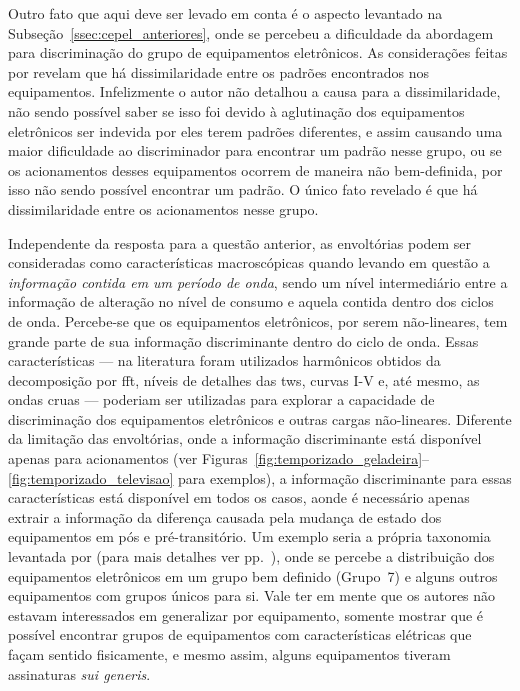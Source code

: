 Outro fato que aqui deve ser levado em conta é o aspecto levantado na
Subseção~\ref{ssec:cepel_anteriores}, onde se percebeu a dificuldade
da abordagem para discriminação do grupo de equipamentos eletrônicos.  As
considerações feitas por \citeauthor*{nilm_cepel_alvaro} revelam que
há dissimilaridade entre os padrões encontrados nos equipamentos.
Infelizmente o autor não detalhou a causa para a dissimilaridade, não
sendo possível saber se isso foi devido à aglutinação dos equipamentos
eletrônicos ser indevida por eles terem padrões diferentes,
e assim causando uma maior dificuldade ao discriminador para encontrar
um padrão nesse grupo, ou se os acionamentos desses equipamentos ocorrem
de maneira não bem-definida, por isso não sendo possível encontrar um
padrão. O único fato revelado é que há dissimilaridade entre os
acionamentos nesse grupo.

Independente da resposta para a questão anterior, as envoltórias podem
ser consideradas como características macroscópicas quando levando em
questão a \emph{informação contida em um período de onda}, sendo um nível
intermediário entre a informação de alteração no nível de consumo e
aquela contida dentro dos ciclos de onda. Percebe-se que os equipamentos
eletrônicos, por serem não-lineares, tem grande parte de sua
informação discriminante dentro do ciclo de onda. Essas
características --- na literatura foram utilizados harmônicos obtidos da
decomposição por \gls{fft}, níveis de detalhes das \glspl{tw}, curvas
I-V e, até mesmo, as ondas cruas --- poderiam ser utilizadas para
explorar a capacidade de discriminação dos equipamentos eletrônicos e
outras cargas não-lineares. Diferente da limitação das envoltórias,
onde a informação discriminante está disponível apenas para
acionamentos (ver
Figuras~\ref{fig:temporizado_geladeira}--\ref{fig:temporizado_televisao}
para exemplos), 
a informação discriminante para essas características
está disponível em todos os casos, aonde é
necessário apenas extrair a informação da diferença causada pela
mudança de estado dos equipamentos em pós e pré-transitório. Um exemplo
seria a própria taxonomia levantada por \citet{nilm_lam_2007_33} (para
mais detalhes ver pp.~\pageref{nilm:curvas_iv}), onde se percebe a
distribuição dos equipamentos eletrônicos em um grupo bem definido
(Grupo~7) e alguns outros equipamentos com grupos únicos para si. Vale
ter em mente que os autores não estavam interessados em generalizar
por equipamento, somente mostrar que é possível encontrar grupos de
equipamentos com características elétricas que façam sentido fisicamente,
e mesmo assim, alguns equipamentos tiveram assinaturas \emph{sui
generis}.

